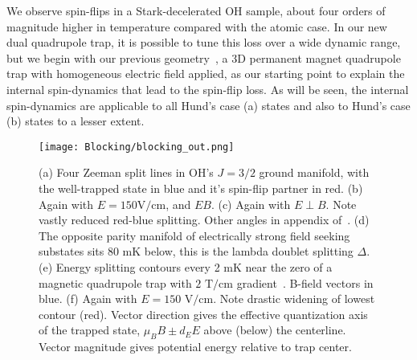 \documentclass[%
 reprint,
groupedaddress,
 amsmath,amssymb,
 aps,
prl,
]{revtex4-1}
\newcommand{\epb}{{$E\!\perp\!B$}}
\begin{document}
We observe spin-flips in a Stark-decelerated OH sample, about four orders of magnitude higher in temperature compared with the atomic case. In our new dual quadrupole trap, it is possible to tune this loss over a wide dynamic range, but we begin with our previous geometry~\cite{Sawyer2008}, a 3D permanent magnet quadrupole trap with homogeneous electric field applied, as our starting point to explain the internal spin-dynamics that lead to the spin-flip loss. As will be seen, the internal spin-dynamics are applicable to all Hund's case (a) states and also to Hund's case (b) states to a lesser extent.%


\begin{figure}[tb]
\texttt{[image: Blocking/blocking\_out.png]}%
\caption{
(a) Four Zeeman split lines in OH's $J=3/2$ ground manifold, with the well-trapped state in blue and it's spin-flip partner in red. (b) Again with $E=150\text{V/cm}$, and $E$\raisebox{0.5px}{$\parallel$}$B$. (c) Again with \epb. Note vastly reduced red-blue splitting. Other angles in appendix of~\cite{Stuhl2013}. (d) The opposite parity manifold of electrically strong field seeking substates sits $80\text{ mK}$ below, this is the lambda doublet splitting $\Delta$. (e) Energy splitting contours every 2 mK near the zero of a magnetic quadrupole trap with $2\text{ T/cm}$ gradient~\cite{Stuhl2012uwave}. B-field vectors in blue. (f) Again with $E=150\text{ V/cm}$. Note drastic widening of lowest contour (red). Vector direction gives the effective quantization axis of the trapped state, $\mu_BB\pm d_EE$ above (below) the centerline. Vector magnitude gives potential energy relative to trap center.
\label{fig:blocking}}
\end{figure}

\end{document}
